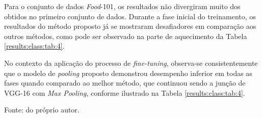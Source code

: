 Para o conjunto de dados \textit{Food}-101, os resultados não divergiram muito dos obtidos no primeiro conjunto de dados. Durante a fase inicial do treinamento, os resultados do método proposto já se mostraram desafiadores em comparação aos outros métodos, como pode ser observado na parte de aquecimento da Tabela \ref{results:class:tab:4}.

No contexto da aplicação do processo de \textit{fine-tuning}, observa-se consistentemente que o modelo de \textit{pooling} proposto demonstrou desempenho inferior em todas as fases quando comparado ao melhor método, que continuou sendo a junção de VGG-16 com \textit{Max Pooling}, conforme ilustrado na Tabela \ref{results:class:tab:4}.

\begin{table}[H]
    \centering
    \caption[\textit{Fine-tuning} de VGG-16 (\textit{Food}-101)]{Resultados por fase de \textit{fine-tuning} de VGG-16 aplicada no conjunto de dados \textit{Food}-101.}
    \label{results:class:tab:4}

    \vspace*{1 cm}
    Fonte: do próprio autor.
\end{table}

